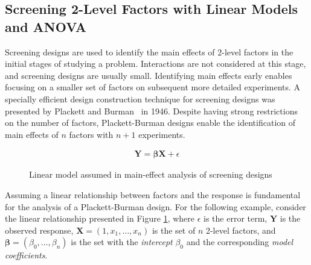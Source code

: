 \documentclass[conference]{IEEEtran}
\begin{document}
\subsection{Screening 2-Level Factors with Linear Models and ANOVA}
\label{sec:orgbc082c1}
Screening designs are used to identify the main effects of 2-level factors in
the initial stages of studying a problem. Interactions are not considered at
this stage, and screening designs are usually small. Identifying main effects
early enables focusing on a smaller set of factors on subsequent more detailed
experiments. A specially efficient design construction technique for screening
designs was presented by Plackett and Burman~\cite{plackett1946design}
in 1946. Despite having strong restrictions on the number of factors,
Plackett-Burman designs enable the identification of main effects of \(n\) factors
with \(n + 1\) experiments.

\begin{figure}
{\normalsize
\begin{align*}
\mathbf{Y} = \bm{\beta}\mathbf{X} + \epsilon
\end{align*}
}
\caption{Linear model assumed in main-effect analysis of screening designs}
\label{fig:linear_assumption}
\end{figure}

Assuming a linear relationship between factors and the response is fundamental
for the analysis of a Plackett-Burman design. For the following example,
consider the linear relationship presented in Figure
\ref{fig:linear_assumption}, where \(\epsilon\) is the error term, \(\mathbf{Y}\) is
the observed response, \(\mathbf{X} = \left(1, x_1,\dots,x_n\right)\) is the set
of \(n\) 2-level factors, and \(\bm{\beta} = \left(\beta_0,\dots,\beta_n\right)\) is
the set with the \emph{intercept} \(\beta_0\) and the corresponding \emph{model
coefficients}.
\end{document}
